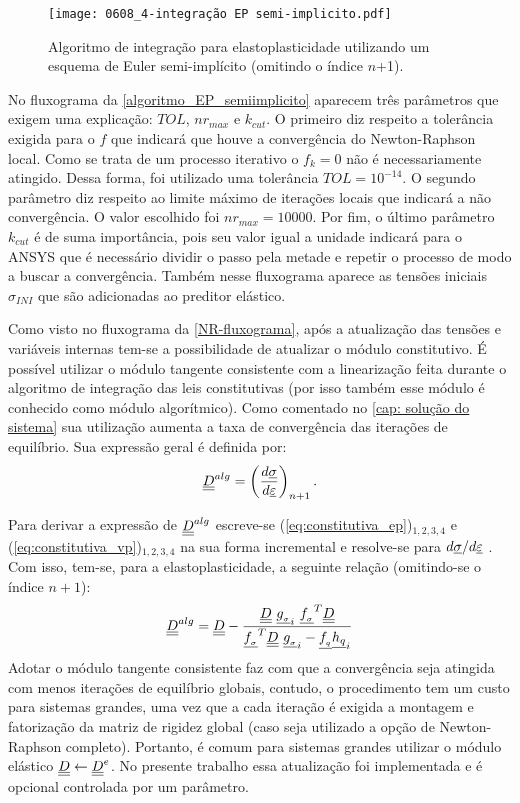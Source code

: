 \begin{figure}[H]
	\begin{center}
		\texttt{[image: 0608\_4-integração EP semi-implicito.pdf]}
	\end{center}
	\caption{\label{algoritmo_EP_semiimplicito}Algoritmo de integração para elastoplasticidade utilizando um esquema de Euler semi-implícito (omitindo o índice $n$+1).}
\end{figure}
No fluxograma da \autoref{algoritmo_EP_semiimplicito} aparecem três parâmetros que exigem uma explicação: $TOL$, $nr_{max}$ e $k_{cut}$. O primeiro diz respeito a tolerância exigida para o $f$ que indicará que houve a convergência do Newton-Raphson local. Como se trata de um processo iterativo o $f_k=0$ não é necessariamente atingido. Dessa forma, foi utilizado uma tolerância $TOL = 10^{-14}$. O segundo parâmetro diz respeito ao limite máximo de iterações locais que indicará a não convergência. O valor escolhido foi $nr_{max} = 10000$. Por fim, o último parâmetro $k_{cut}$ é de suma importância, pois seu valor igual a unidade indicará para o ANSYS que é necessário dividir o passo pela metade e repetir o processo de modo a buscar a convergência. Também nesse fluxograma aparece as tensões iniciais $\sigma_{INI}$ que são adicionadas ao preditor elástico.

Como visto no fluxograma da \autoref{NR-fluxograma}, após a atualização das tensões e variáveis internas tem-se a possibilidade de atualizar o módulo constitutivo. É possível utilizar o módulo tangente consistente com a linearização feita durante o algoritmo de integração das leis constitutivas (por isso também esse módulo é conhecido como módulo algorítmico). Como comentado no \autoref{cap: solução do sistema} sua utilização aumenta a taxa de convergência das iterações de equilíbrio. Sua expressão geral é definida por:
\begin{equation}
	\label{eq:D_alg1}
	\underline{\underline D}^{alg} = \left(\dfrac{d\underline \sigma}{d\underline{\varepsilon}} \right)_{n+1}.
\end{equation}

Para derivar a expressão de $\underline{\underline D}^{alg}$  escreve-se (\ref{eq:constitutiva_ep})$_{1,2,3,4}$ e (\ref{eq:constitutiva_vp})$_{1,2,3,4}$ na sua forma incremental e resolve-se para $d\underline \sigma/d\underline{\varepsilon}$  \cite[p. 285]{Belytschko2000}. Com isso, tem-se, para a elastoplasticidade, a seguinte relação (omitindo-se o índice $n+1$):
\begin{equation}
	\label{eq:D_alg_ep}
	\underline{\underline D}^{alg} = \underline{\underline D} - \dfrac{\underline{\underline D}~\underline{g_{_\sigma}}_i~\underline{f_{_\sigma}}^T \underline{\underline D}}{\underline{f_{_\sigma}}^T\underline{\underline D}~\underline{g_{_\sigma}}_i-\underline{f_{_q}} \underline{h_q}_i}
\end{equation}
Adotar o módulo tangente consistente faz com que a convergência seja atingida com menos iterações de equilíbrio globais, contudo, o procedimento tem um custo para sistemas grandes, uma vez que a cada iteração é exigida a montagem e fatorização da matriz de rigidez global (caso seja utilizado a opção de Newton-Raphson completo).  Portanto, é comum para sistemas grandes utilizar o módulo elástico $\underline{\underline D} \leftarrow \underline{\underline D}^e$. No presente trabalho essa atualização foi implementada e é opcional controlada por um parâmetro.

